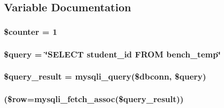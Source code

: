\subsection{\-Variable \-Documentation}
\hypertarget{makeBench_8php_adc0a189fac719187ba2e6f01ca0f2466}{
\subsubsection[{\$counter}]{\setlength{\rightskip}{0pt plus 5cm}\$counter = 1}}\label{makeBench_8php_adc0a189fac719187ba2e6f01ca0f2466}
\hypertarget{makeBench_8php_af59a5f7cd609e592c41dc3643efd3c98}{
\subsubsection[{\$query}]{\setlength{\rightskip}{0pt plus 5cm}\$query = \char`\"{}\-S\-E\-L\-E\-C\-T student\-\_\-id \-F\-R\-O\-M bench\-\_\-temp\char`\"{}}}\label{makeBench_8php_af59a5f7cd609e592c41dc3643efd3c98}
\hypertarget{makeBench_8php_ade0b3dacf5d65d8f2293ffa78561fe31}{
\subsubsection[{\$query\-\_\-result}]{\setlength{\rightskip}{0pt plus 5cm}\$query\-\_\-result = mysqli\-\_\-query(\$dbconn, \$query)}}\label{makeBench_8php_ade0b3dacf5d65d8f2293ffa78561fe31}
\hypertarget{makeBench_8php_abbca5b4e0da1a7b7e95bb777ad93473d}{
\subsubsection[{while}]{(\$row=mysqli\-\_\-fetch\-\_\-assoc(\$query\-\_\-result))}}\label{makeBench_8php_abbca5b4e0da1a7b7e95bb777ad93473d}
